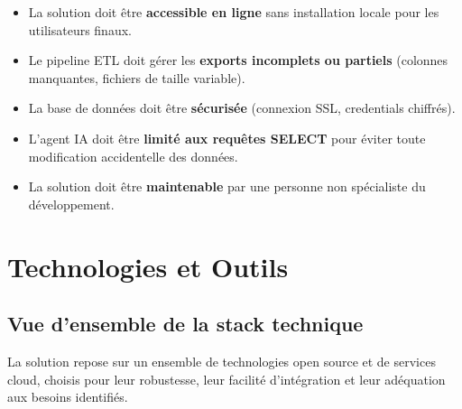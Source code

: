 \documentclass[12pt, a4paper]{report}
\begin{document}
\begin{itemize}[leftmargin=2em]
    \item La solution doit être \textbf{accessible en ligne} sans installation locale pour les utilisateurs finaux.
    \item Le pipeline ETL doit gérer les \textbf{exports incomplets ou partiels} (colonnes manquantes, fichiers de taille variable).
    \item La base de données doit être \textbf{sécurisée} (connexion SSL, credentials chiffrés).
    \item L'agent IA doit être \textbf{limité aux requêtes SELECT} pour éviter toute modification accidentelle des données.
    \item La solution doit être \textbf{maintenable} par une personne non spécialiste du développement.
\end{itemize}

\chapter{Technologies et Outils}

\section{Vue d'ensemble de la stack technique}

La solution repose sur un ensemble de technologies open source et de services cloud, choisis pour leur robustesse, leur facilité d'intégration et leur adéquation aux besoins identifiés.
\end{document}
